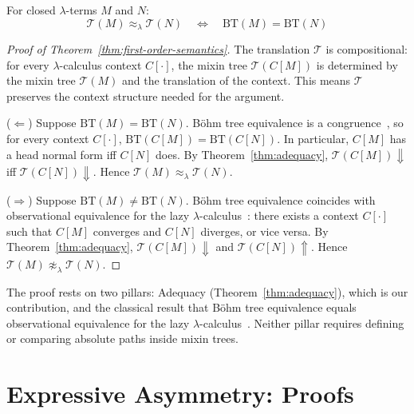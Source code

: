 \begin{theorem}%
  \label{thm:first-order-semantics}
  For closed $\lambda$-terms $M$ and $N$:
  \[
    \mathcal{T}(M) \approx_\lambda \mathcal{T}(N)
    \quad\Longleftrightarrow\quad
    \mathrm{BT}(M) = \mathrm{BT}(N)
  \]
\end{theorem}

\begin{proof}[Proof of Theorem~\ref{thm:first-order-semantics}]
  The translation $\mathcal{T}$ is compositional: for every
  $\lambda$-calculus context $C[\cdot]$, the mixin tree
  $\mathcal{T}(C[M])$ is determined by the mixin tree
  $\mathcal{T}(M)$ and the translation of the context.
  This means $\mathcal{T}$ preserves the context structure
  needed for the argument.

  \medskip\noindent
  ($\Leftarrow$)
  Suppose $\mathrm{BT}(M) = \mathrm{BT}(N)$.
  B\"ohm tree equivalence is a congruence~\cite{barendregt1984-lambda-calculus},
  so for every context $C[\cdot]$,
  $\mathrm{BT}(C[M]) = \mathrm{BT}(C[N])$.
  In particular, $C[M]$ has a head normal form iff $C[N]$ does.
  By Theorem~\ref{thm:adequacy},
  $\mathcal{T}(C[M]){\Downarrow}$ iff
  $\mathcal{T}(C[N]){\Downarrow}$.
  Hence $\mathcal{T}(M) \approx_\lambda \mathcal{T}(N)$.

  \medskip\noindent
  ($\Rightarrow$)
  Suppose $\mathrm{BT}(M) \neq \mathrm{BT}(N)$.
  B\"ohm tree equivalence coincides with observational
  equivalence for the lazy
  $\lambda$-calculus~\cite{abramsky1993-full-abstraction-lazy-lambda,abramsky1995-games-full-abstraction-lazy-lambda}:
  there exists a context $C[\cdot]$ such that $C[M]$ converges
  and $C[N]$ diverges, or vice versa.
  By Theorem~\ref{thm:adequacy},
  $\mathcal{T}(C[M]){\Downarrow}$ and
  $\mathcal{T}(C[N]){\Uparrow}$.
  Hence $\mathcal{T}(M) \not\approx_\lambda \mathcal{T}(N)$.
\end{proof}

\noindent
The proof rests on two pillars: Adequacy
(Theorem~\ref{thm:adequacy}), which is our contribution, and
the classical result that B\"ohm tree equivalence equals
observational equivalence for the lazy
$\lambda$-calculus~\cite{abramsky1993-full-abstraction-lazy-lambda,abramsky1995-games-full-abstraction-lazy-lambda}.
Neither pillar requires defining or comparing
absolute paths inside mixin trees.

\section{Expressive Asymmetry: Proofs}
\label{app:expressiveness}

